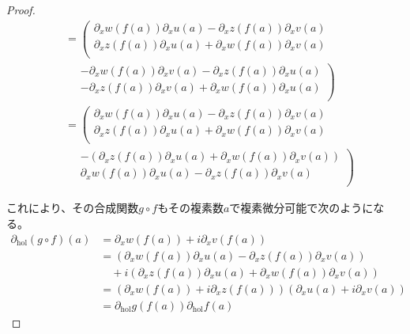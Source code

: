 \documentclass[dvipdfmx]{jsarticle}
\begin{document}
\begin{proof}
\begin{align*}
&= \left( \begin{matrix}
\partial_{x}w\left( f(a) \right)\partial_{x}u(a) - \partial_{x}z\left( f(a) \right)\partial_{x}v(a) \\
\partial_{x}z\left( f(a) \right)\partial_{x}u(a) + \partial_{x}w\left( f(a) \right)\partial_{x}v(a) \\
\end{matrix} \right. \\
&\quad \left. \begin{matrix}
- \partial_{x}w\left( f(a) \right)\partial_{x}v(a) - \partial_{x}z\left( f(a) \right)\partial_{x}u(a) \\
- \partial_{x}z\left( f(a) \right)\partial_{x}v(a) + \partial_{x}w\left( f(a) \right)\partial_{x}u(a) \\
\end{matrix} \right) \\
&= \left( \begin{matrix}
\partial_{x}w\left( f(a) \right)\partial_{x}u(a) - \partial_{x}z\left( f(a) \right)\partial_{x}v(a) \\
\partial_{x}z\left( f(a) \right)\partial_{x}u(a) + \partial_{x}w\left( f(a) \right)\partial_{x}v(a) \\
\end{matrix} \right.\\
&\quad \left. \begin{matrix}
 - \left( \partial_{x}z\left( f(a) \right)\partial_{x}u(a) + \partial_{x}w\left( f(a) \right)\partial_{x}v(a) \right) \\
\partial_{x}w\left( f(a) \right)\partial_{x}u(a) - \partial_{x}z\left( f(a) \right)\partial_{x}v(a) \\
\end{matrix} \right)
\end{align*}\par
これにより、その合成関数$g \circ f$もその複素数$a$で複素微分可能で次のようになる。
\begin{align*}
\partial_{\mathrm{hol}}(g \circ f)(a) &= \partial_{x}w\left( f(a) \right) + i\partial_{x}v\left( f(a) \right)\\
&= \left( \partial_{x}w\left( f(a) \right)\partial_{x}u(a) - \partial_{x}z\left( f(a) \right)\partial_{x}v(a) \right) \\
&\quad + i\left( \partial_{x}z\left( f(a) \right)\partial_{x}u(a) + \partial_{x}w\left( f(a) \right)\partial_{x}v(a) \right)\\
&= \left( \partial_{x}w\left( f(a) \right) + i\partial_{x}z\left( f(a) \right) \right)\left( \partial_{x}u(a) + i\partial_{x}v(a) \right)\\
&= \partial_{\mathrm{hol}}g\left( f(a) \right)\partial_{\mathrm{hol}}f(a)
\end{align*}
\end{proof}
\end{document}
